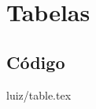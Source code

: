 \section{Tabelas} %
\label{sec:tabelas}

\subsection*{Código} %
\label{sub:c_digo}



\begin{frame}


 {luiz/table.tex}

\end{frame}